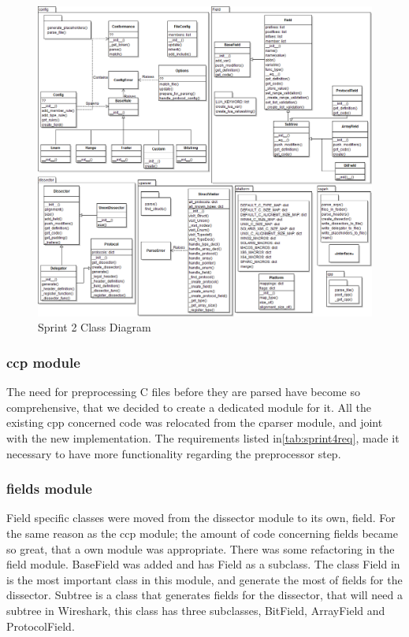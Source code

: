 \begin{figure}[ht]
	\center
	\includegraphics[width=\textwidth]{./sprints/img/ClassDiagramSprint4v2.png}
	\caption{Sprint 2 Class Diagram \label{fig:sp2class}}
\end{figure}

\subsubsection{ccp module}
The need for preprocessing C files before they are parsed have become so comprehensive, that we decided to create a dedicated module for it. All the existing cpp concerned code was relocated from the cparser module, and joint with the new implementation. The requirements listed in\autoref{tab:sprint4req}, made it necessary to have more functionality regarding the preprocessor step. 

\subsubsection{fields module}
Field specific classes were moved from the dissector module to its own, field. For the same reason as the ccp module; the amount of code concerning fields became so great, that a own module was appropriate. There was some refactoring in the field module. BaseField was added and has Field as a subclass. The class Field in is the most important class in this module, and generate the most of fields for the dissector. Subtree is a class that generates fields for the dissector, that will need a subtree in Wireshark, this class has three subclasses, BitField, ArrayField and ProtocolField.

